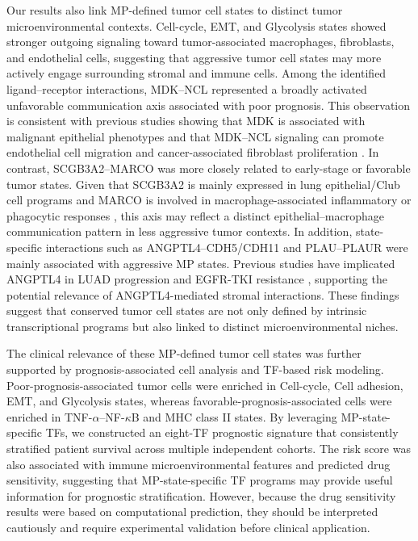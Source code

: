 \documentclass[pdflatex,sn-mathphys-num]{sn-jnl}%
\theoremstyle{thmstyleone}%
\theoremstyle{thmstyletwo}%
\theoremstyle{thmstylethree}%
\begin{document}
Our results also link MP-defined tumor cell states to distinct tumor microenvironmental contexts. Cell-cycle, EMT, and Glycolysis states showed stronger outgoing signaling toward tumor-associated macrophages, fibroblasts, and endothelial cells, suggesting that aggressive tumor cell states may more actively engage surrounding stromal and immune cells. Among the identified ligand--receptor interactions, MDK--NCL represented a broadly activated unfavorable communication axis associated with poor prognosis. This observation is consistent with previous studies showing that MDK is associated with malignant epithelial phenotypes and that MDK--NCL signaling can promote endothelial cell migration and cancer-associated fibroblast proliferation \cite{bib17,bib18,bib19}. In contrast, SCGB3A2--MARCO was more closely related to early-stage or favorable tumor states. Given that SCGB3A2 is mainly expressed in lung epithelial/Club cell programs and MARCO is involved in macrophage-associated inflammatory or phagocytic responses \cite{bib20,bib21}, this axis may reflect a distinct epithelial--macrophage communication pattern in less aggressive tumor contexts. In addition, state-specific interactions such as ANGPTL4--CDH5/CDH11 and PLAU--PLAUR were mainly associated with aggressive MP states. Previous studies have implicated ANGPTL4 in LUAD progression and EGFR-TKI resistance \cite{bib52}, supporting the potential relevance of ANGPTL4-mediated stromal interactions. These findings suggest that conserved tumor cell states are not only defined by intrinsic transcriptional programs but also linked to distinct microenvironmental niches.

The clinical relevance of these MP-defined tumor cell states was further supported by prognosis-associated cell analysis and TF-based risk modeling. Poor-prognosis-associated tumor cells were enriched in Cell-cycle, Cell adhesion, EMT, and Glycolysis states, whereas favorable-prognosis-associated cells were enriched in TNF-\(\alpha\)--NF-\(\kappa\)B and MHC class II states. By leveraging MP-state-specific TFs, we constructed an eight-TF prognostic signature that consistently stratified patient survival across multiple independent cohorts. The risk score was also associated with immune microenvironmental features and predicted drug sensitivity, suggesting that MP-state-specific TF programs may provide useful information for prognostic stratification. However, because the drug sensitivity results were based on computational prediction, they should be interpreted cautiously and require experimental validation before clinical application.
\end{document}
